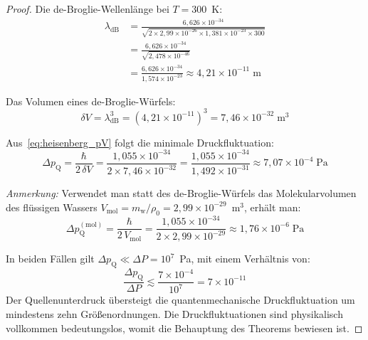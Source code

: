 ﻿\documentclass[12pt,a4paper]{report}
\begin{document}
\begin{proof}
	Die de-Broglie-Wellenlänge bei $T = 300$~K:
	\begin{align*}
		\lambda_\mathrm{dB} &= \frac{6{,}626\times10^{-34}}{\sqrt{2\times2{,}99\times10^{-26}\times1{,}381\times10^{-23}\times300}} \\
		&= \frac{6{,}626\times10^{-34}}{\sqrt{2{,}478\times10^{-46}}} \\
		&= \frac{6{,}626\times10^{-34}}{1{,}574\times10^{-23}}
		\approx 4{,}21\times10^{-11}\;\text{m}
		\label{eq:lambda_db_numerisch}
	\end{align*}
	
	Das Volumen eines de-Broglie-Würfels:
	\begin{equation}
		\delta V = \lambda_\mathrm{dB}^3 = (4{,}21\times10^{-11})^3 = 7{,}46\times10^{-32}\;\text{m}^3
		\label{eq:dV_numerisch}
	\end{equation}
	
	Aus~\eqref{eq:heisenberg_pV} folgt die minimale Druckfluktuation:
	\begin{equation}
		\Delta p_\mathrm{Q} = \frac{\hbar}{2\,\delta V} = \frac{1{,}055\times10^{-34}}{2\times7{,}46\times10^{-32}} = \frac{1{,}055\times10^{-34}}{1{,}492\times10^{-31}} \approx 7{,}07\times10^{-4}\;\text{Pa}
		\label{eq:delta_p_ausfuehrlich}
	\end{equation}
	
	\textit{Anmerkung:} Verwendet man statt des de-Broglie-Würfels das Molekularvolumen des flüssigen Wassers $V_\mathrm{mol} = m_\mathrm{w}/\rho_0 = 2{,}99\times10^{-29}$~m$^3$, erhält man:
	\begin{equation}
		\Delta p_\mathrm{Q}^\mathrm{(mol)} = \frac{\hbar}{2\,V_\mathrm{mol}} = \frac{1{,}055\times10^{-34}}{2\times2{,}99\times10^{-29}} \approx 1{,}76\times10^{-6}\;\text{Pa}
		\label{eq:delta_p_mol}
	\end{equation}
	
	In beiden Fällen gilt $\Delta p_\mathrm{Q} \ll \Delta P = 10^7$~Pa, mit einem Verhältnis von:
	\begin{equation}
		\frac{\Delta p_\mathrm{Q}}{\Delta P} \lesssim \frac{7\times10^{-4}}{10^7} = 7\times10^{-11}
		\label{eq:verhaeltnis_fluktuation}
	\end{equation}
	Der Quellenunterdruck übersteigt die quantenmechanische Druckfluktuation um mindestens zehn Größenordnungen. Die Druckfluktuationen sind physikalisch vollkommen bedeutungslos, womit die Behauptung des Theorems bewiesen ist.
\end{proof}
\end{document}
